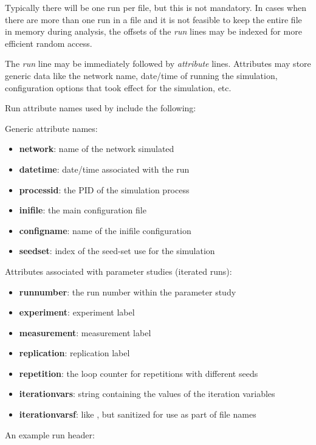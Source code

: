 Typically there will be one run per file, but this is not mandatory.
In cases when there are more than one run in a file and it is not feasible
to keep the entire file in memory during analysis, the offsets of the \textit{run}
lines may be indexed for more efficient random access.

The \textit{run} line may be immediately followed by \textit{attribute} lines.
Attributes may store generic data like the network name, date/time of running
the simulation, configuration options that took effect for the simulation, etc.

Run attribute names used by {\opp} include the following:

Generic attribute names:

\begin{itemize}
    \item \textbf{network}: name of the network simulated
    \item \textbf{datetime}: date/time associated with the run
    \item \textbf{processid}: the PID of the simulation process
    \item \textbf{inifile}: the main configuration file
    \item \textbf{configname}: name of the inifile configuration
    \item \textbf{seedset}: index of the seed-set use for the simulation
\end{itemize}

Attributes associated with parameter studies (iterated runs):

\begin{itemize}
    \item \textbf{runnumber}: the run number within the parameter study
    \item \textbf{experiment}: experiment label
    \item \textbf{measurement}: measurement label
    \item \textbf{replication}: replication label
    \item \textbf{repetition}: the loop counter for repetitions with different seeds
    \item \textbf{iterationvars}: string containing the values of the iteration variables
    \item \textbf{iterationvarsf}: like , but sanitized for use as part of file names
\end{itemize}

An example run header:

